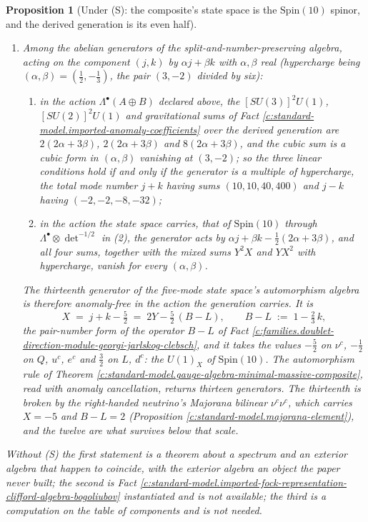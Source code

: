 \documentclass[11pt]{article}
\newtheorem{proposition}[theorem]{Proposition}
\theoremstyle{definition}
\theoremstyle{plain}
\begin{document}
\begin{proposition}[Under (S): the composite's state space is the $\mathrm{Spin}(10)$ spinor, and the derived generation is its even half]
\begin{enumerate}
\item Among the abelian generators of the split-and-number-preserving algebra, acting on the component $(j,k)$ by $\alpha j + \beta k$ with $\alpha, \beta$ real (hypercharge being $(\alpha, \beta) = (\tfrac12, -\tfrac13)$, the pair $(3,-2)$ divided by six):
\begin{enumerate}
\item[(a)] in the action $\Lambda^{\bullet}(A \oplus B)$ declared above, the $[SU(3)]^{2}U(1)$, $[SU(2)]^{2}U(1)$ and gravitational sums of Fact \ref{c:standard-model.imported-anomaly-coefficients} over the derived generation are $2(2\alpha + 3\beta)$, $2(2\alpha + 3\beta)$ and $8(2\alpha + 3\beta)$, and the cubic sum is a cubic form in $(\alpha, \beta)$ vanishing at $(3,-2)$; so the three linear conditions hold if and only if the generator is a multiple of hypercharge, the total mode number $j + k$ having sums $(10, 10, 40, 400)$ and $j - k$ having $(-2, -2, -8, -32)$;
\item[(b)] in the action the state space carries, that of $\mathrm{Spin}(10)$ through $\Lambda^{\bullet} \otimes \det^{-1/2}$ in (2), the generator acts by $\alpha j + \beta k - \tfrac12(2\alpha + 3\beta)$, and all four sums, together with the mixed sums $Y^{2}X$ and $YX^{2}$ with hypercharge, vanish for every $(\alpha, \beta)$.
\end{enumerate}
The thirteenth generator of the five-mode state space's automorphism algebra is therefore anomaly-free in the action the generation carries. It is
\[
X \;=\; j + k - \tfrac52 \;=\; 2Y - \tfrac52\,(B - L), \qquad B - L \;:=\; 1 - \tfrac23\,k,
\]
the pair-number form of the operator $B - L$ of Fact \ref{c:families.doublet-direction-module-georgi-jarlskog-clebsch}, and it takes the values $-\tfrac52$ on $\nu^{c}$, $-\tfrac12$ on $Q$, $u^{c}$, $e^{c}$ and $\tfrac32$ on $L$, $d^{c}$: the $U(1)_{X}$ of $\mathrm{Spin}(10)$. The automorphism rule of Theorem \ref{c:standard-model.gauge-algebra-minimal-massive-composite}, read with anomaly cancellation, returns thirteen generators. The thirteenth is broken by the right-handed neutrino's Majorana bilinear $\nu^{c}\nu^{c}$, which carries $X = -5$ and $B - L = 2$ (Proposition \ref{c:standard-model.majorana-element}), and the twelve are what survives below that scale.
\end{enumerate}
Without (S) the first statement is a theorem about a spectrum and an exterior algebra that happen to coincide, with the exterior algebra an object the paper never built; the second is Fact \ref{c:standard-model.imported-fock-representation-clifford-algebra-bogoliubov} instantiated and is not available; the third is a computation on the table of components and is not needed.
\end{proposition}
\end{document}
